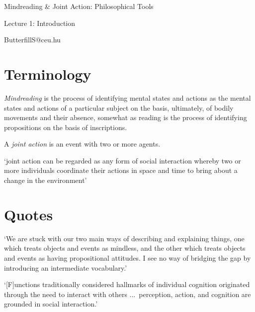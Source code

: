 \documentclass[11pt]{extarticle}
\date{}
\begin{document}
\begin{multicols}{3}

\setlength\footnotesep{1em}









\begin{center}
{\Large
Mindreading \& Joint Action: Philosophical Tools}

Lecture 1: Introduction


ButterfillS@ceu.hu
\end{center}



\section{Terminology}
\textit{Mindreading} is 
	the process of 
	identifying mental states and actions 
	as the mental states and actions 	of a particular subject 
	on the basis, ultimately, of bodily movements and their absence,
somewhat as reading is the process of identifying propositions on the basis of inscriptions.\citep%
{Apperly:2010kx}

A \textit{joint action} is an event with two or more agents.\citep{ludwig_collective_2007}

`joint action can be regarded as any form of social interaction whereby two or more individuals coordinate their actions in space and time to bring about a change in the environment'\citep%
{Sebanz:2006yq}



\section{Quotes}
`We are stuck with our two main ways of describing and explaining things, one which treats objects and events as mindless, and the other which treats objects and events as having propositional attitudes. I see no way of bridging the gap by introducing an intermediate vocabulary.' \citep%
{Davidson:2003bw}


`[F]unctions traditionally considered hallmarks of individual cognition originated through the need to interact with others ...\
perception, action, and cognition are grounded in social interaction.'\citep%
{Knoblich:2006bn}


\end{multicols}
\end{document}
